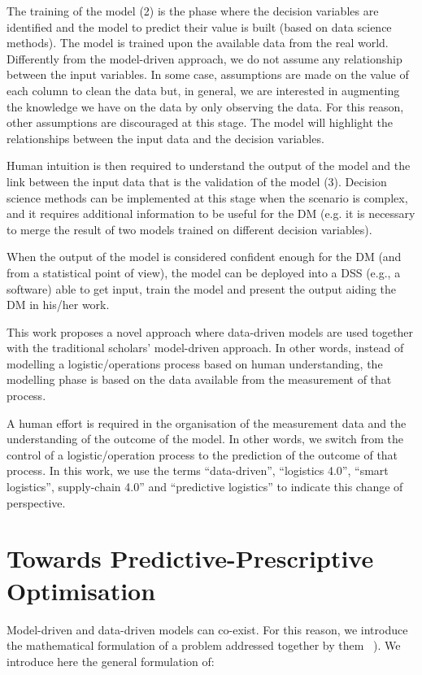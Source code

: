 The training of the model (2) is the phase where the decision variables are identified and the model to predict their value is built (based on data science methods). The model is trained upon the available data from the real world. Differently from the model-driven approach, we do not assume any relationship between the input variables. In some case, assumptions are made on the value of each column to clean the data but, in general, we are interested in augmenting the knowledge we have on the data by only observing the data. For this reason, other assumptions are discouraged at this stage. The model will highlight the relationships between the input data and the decision variables.\par

Human intuition is then required to understand the output of the model and the link between the input data that is the validation of the model (3). Decision science methods can be implemented at this stage when the scenario is complex, and it requires additional information to be useful for the DM (e.g. it is necessary to merge the result of two models trained on different decision variables).\par

When the output of the model is considered confident enough for the DM (and from a statistical point of view), the model can be deployed into a DSS (e.g., a software) able to get input, train the model and present the output aiding the DM in his/her work.\par

This work proposes a novel approach where data-driven models are used together with the traditional scholars’ model-driven approach. In other words, instead of modelling a logistic/operations process based on human understanding, the modelling phase is based on the data available from the measurement of that process.\par

A human effort is required in the organisation of the measurement data and the understanding of the outcome of the model. In other words, we switch from the control of a logistic/operation process to the prediction of the outcome of that process. In this work, we use the terms “data-driven”, “logistics 4.0”, “smart logistics”, supply-chain 4.0” and “predictive logistics” to indicate this change of perspective.

\section{Towards Predictive-Prescriptive Optimisation}
Model-driven and data-driven models can co-exist. For this reason, we introduce the mathematical formulation of a problem addressed together by them ~\cite{Bertsimas2014}). We introduce here the general formulation of:

